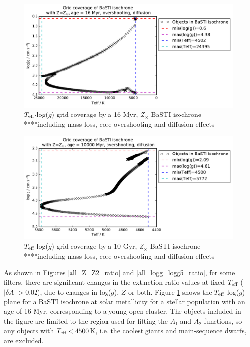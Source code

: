 \documentclass[12pt, a4paper]{report}
\begin{document}
\begin{figure}
\includegraphics[scale=0.4]{../wfc3_16_23Myr_10Gyr_complex_solar/wfc3_ATLAS9_grid_BaSTI_coverage_c16_complex_Zsol_4500.pdf}
\caption{$T_{\textnormal{eff}}$-log($g$) grid coverage by a 16 Myr, $Z_{\odot}$ BaSTI isochrone ****including mass-loss, core overshooting and diffusion effects}
\label{BaSTI_coverage_16M}
\end{figure}

\begin{figure}
\includegraphics[scale=0.4]{../wfc3_16_23Myr_10Gyr_complex_solar/wfc3_ATLAS9_grid_BaSTI_coverage_c10000_complex_Zsol_4500.pdf}
\caption{$T_{\textnormal{eff}}$-log($g$) grid coverage by a 10 Gyr, $Z_{\odot}$ BaSTI isochrone ****including mass-loss, core overshooting and diffusion effects}
\label{BaSTI_coverage_10G}
\end{figure}

As shown in Figures \ref{all_Z_Z2_ratio} and \ref{all_logg_logg5_ratio}, for some filters, there are significant changes in the extinction ratio values at fixed $T_{\textnormal{eff}}$ ($|\delta A| > 0.02$), due to changes in log($g$), $Z$ or both. Figure \ref{BaSTI_coverage_16M} shows the $T_{\textnormal{eff}}$-log($g$) plane for a BaSTI isochrone at solar metallicity for a stellar population with an age of 16 Myr, corresponding to a young open cluster. The objects included in the figure are limited to the region used for fitting the $A_{1}$ and $A_{2}$ functions, so any objects with $T_{\textnormal{eff}} < 4500$K, i.e. the coolest giants and main-sequence dwarfs, are excluded.
\end{document}

